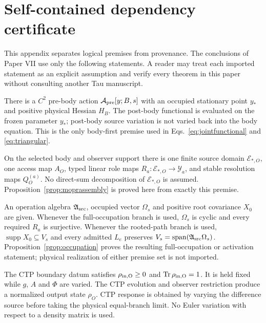 \documentclass[11pt]{article}
\begin{document}
\appendix


\section{Self-contained dependency certificate}
\label{app:dependencycertificate}

This appendix separates logical premises from provenance.  The conclusions of
Paper VII use only the following statements.  A reader may treat each imported
statement as an explicit assumption and verify every theorem in this paper
without consulting another Tau manuscript.

\begin{description}[style=nextline,leftmargin=0pt]
\item[\textbf{D1: body-first order.}]
There is a $C^2$ pre-body action $\mathcal A_{\rm pre}[y;B,s]$ with an occupied
stationary point $y_*$ and positive physical Hessian $H_B$.  The post-body
functional is evaluated on the frozen parameter $y_*$; post-body source
variation is not varied back into the body equation.  This is the only
body-first premise used in Eqs.~\eqref{eq:jointfunctional} and
\eqref{eq:triangular}.

\item[\textbf{D2: common typed source domain.}]
On the selected body and observer support there is one finite source domain
$\mathcal E_{*,O}$, one access map $A_O$, typed linear role maps
$R_a:\mathcal E_{*,O}\to\mathcal Y_a$, and stable resolution maps
$Q_O^{(a)}$.  No direct-sum decomposition of $\mathcal E_{*,O}$ is assumed.
Proposition~\ref{prop:moprassembly} is proved here from exactly this premise.

\item[\textbf{D3: occupied operation data.}]
An operation algebra $\mathfrak A_{\rm src}$, occupied vector $\Omega_s$ and
positive root covariance $X_0$ are given.  Whenever the full-occupation branch
is used, $\Omega_s$ is cyclic and every required $R_a$ is surjective.
Whenever the rooted-path branch is used,
$\operatorname{supp}X_0\subseteq V_s$ and every admitted $L_e$ preserves
$V_s=\operatorname{span}(\mathfrak A_{\rm src}\Omega_s)$.
Proposition~\ref{prop:occupation} proves the resulting full-occupation or
activation statement; physical realization of either premise set is not
imported.

\item[\textbf{D4: fixed quantum preparation.}]
The CTP boundary datum satisfies $\rho_{\rm in,O}\geq0$ and
$\operatorname{Tr}\rho_{\rm in,O}=1$.  It is held fixed while $g$, $A$ and
$\Phi$ are varied.  The CTP evolution and observer restriction produce a
normalized output state $\rho_O$.  CTP response is obtained by varying the
difference source before taking the physical equal-branch limit.  No Euler
variation with respect to a density matrix is used.


\end{description}
\end{document}
